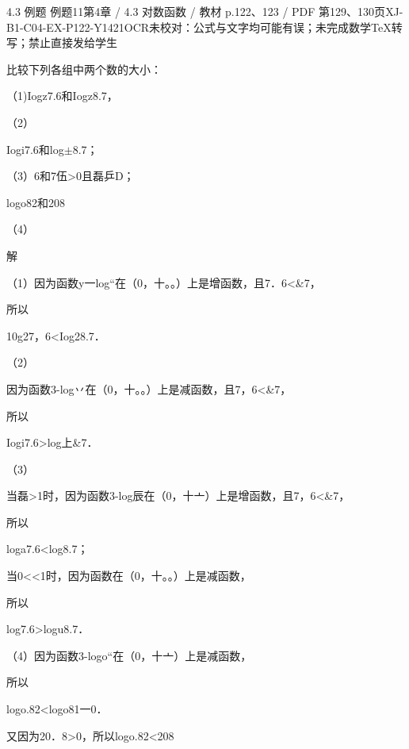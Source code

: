 \begin{bankitem}{4.3 例题 例题11}{第4章 / 4.3 对数函数 / 教材 p.122、123 / PDF 第129、130页}{XJ-B1-C04-EX-P122-Y1421}{OCR未校对：公式与文字均可能有误；未完成数学TeX转写；禁止直接发给学生}
\begin{ocrdraft}
\par
比较下列各组中两个数的大小：
\par
（1)Iogz7.6和Iogz8.7，
\par
（2）
\par
Iogi7.6和log\ensuremath{\pm}8.7；
\par
（3）6和7伍>0且磊乒D；
\par
logo82和208
\par
（4）
\par
[教材p.123 / PDF第130页]
\par
解
\par
（1）因为函数y一log“在（0，十。。）上是增函数，且7．6<\&7，
\par
所以
\par
10g27，6<Iog28.7．
\par
（2）
\par
因为函数3-log丷在（0，十。。）上是减函数，且7，6<\&7，
\par
所以
\par
Iogi7.6>log上\&7．
\par
（3）
\par
当磊>1时，因为函数3-log辰在（0，十亠）上是增函数，且7，6<\&7，
\par
所以
\par
loga7.6<log8.7；
\par
当0<<1时，因为函数在（0，十。。）上是减函数，
\par
所以
\par
log7.6>logu8.7．
\par
（4）因为函数3-logo“在（0，十亠）上是减函数，
\par
所以
\par
logo.82<logo81一0．
\par
又因为20．8>0，所以logo.82<208
\end{ocrdraft}
\end{bankitem}
